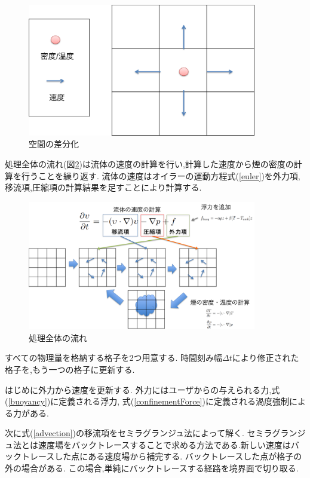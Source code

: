 \begin{figure}
	\begin{center}
		\includegraphics[width=100mm]{grid.png}
		\caption{空間の差分化}
		\label{grid}
	\end{center}
\end{figure}


処理全体の流れ(図\ref{overview})は流体の速度の計算を行い,計算した速度から煙の密度の計算を行うことを繰り返す.
流体の速度はオイラーの運動方程式(\ref{euler})を外力項,移流項,圧縮項の計算結果を足すことにより計算する.

\begin{figure}
	\begin{center}
		\includegraphics[width=100mm]{overview.png}
		\caption{処理全体の流れ}
		\label{overview}
	\end{center}
\end{figure}

すべての物理量を格納する格子を2つ用意する.
時間刻み幅$\Delta t$により修正された格子を,もう一つの格子に更新する.

はじめに外力から速度を更新する.
外力にはユーザからの与えられる力,式(\ref{buoyancy})に定義される浮力,
式(\ref{confinementForce})に定義される渦度強制による力がある.

次に式(\ref{advection})の移流項をセミラグランジュ法によって解く.
セミラグランジュ法とは速度場をバックトレースすることで求める方法である.新しい速度はバックトレースした点にある速度場から補完する.
バックトレースした点が格子の外の場合がある.
この場合,単純にバックトレースする経路を境界面で切り取る.

